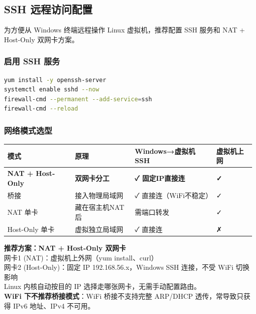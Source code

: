 \documentclass[12pt,a4paper]{ctexart}
\begin{document}
\subsection{SSH 远程访问配置}

为方便从 Windows 终端远程操作 Linux 虚拟机，推荐配置 SSH 服务和 NAT + Host-Only 双网卡方案。

\subsubsection{启用 SSH 服务}

\begin{cmdbox}
\small
\begin{lstlisting}[language=bash,numbers=none]
yum install -y openssh-server
systemctl enable sshd --now
firewall-cmd --permanent --add-service=ssh
firewall-cmd --reload
\end{lstlisting}
\end{cmdbox}

\subsubsection{网络模式选型}

\begin{table}[h]
\centering
\begin{tabular}{p{2.2cm}p{4cm}p{3.5cm}p{3.5cm}}
\toprule
模式       & 原理 & Windows→虚拟机SSH & 虚拟机上网 \\
\midrule
\textbf{NAT + Host-Only} & \textbf{双网卡分工} & \textbf{✓ 固定IP直接连} & \textbf{✓} \\
桥接       & 接入物理局域网  & ✓ 直接连（WiFi不稳定） & ✓ \\
NAT 单卡   & 藏在宿主机NAT后 & 需端口转发 & ✓ \\
Host-Only 单卡 & 虚拟独立局域网  & ✓ 直接连 & ✗ \\
\bottomrule
\end{tabular}
\end{table}

\begin{infobox}
  \textbf{推荐方案：NAT + Host-Only 双网卡} \\
  网卡1 (NAT)：虚拟机上外网（yum install、curl） \\
  网卡2 (Host-Only)：固定 IP 192.168.56.x，Windows SSH 连接，不受 WiFi 切换影响 \\
  Linux 内核自动按目的 IP 选择走哪张网卡，无需手动配置路由。 \\
  \textbf{WiFi 下不推荐桥接模式}：WiFi 桥接不支持完整 ARP/DHCP 透传，常导致只获得 IPv6 地址、IPv4 不可用。
\end{infobox}
\end{document}
